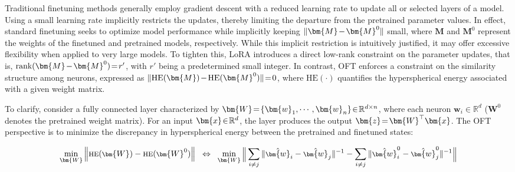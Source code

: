 Traditional finetuning methods generally employ gradient descent with a reduced learning rate to update all or selected layers of a model. Using a small learning rate implicitly restricts the updates, thereby limiting the departure from the pretrained parameter values. In effect, standard finetuning seeks to optimize model performance while implicitly keeping $\thickmuskip=2mu \medmuskip=2mu \| \bm{M} - \bm{M}^0\|$ small, where $\bm{M}$ and $\bm{M}^0$ represent the weights of the finetuned and pretrained models, respectively. While this implicit restriction is intuitively justified, it may offer excessive flexibility when applied to very large models. To tighten this, LoRA introduces a direct low-rank constraint on the parameter updates, that is, $\thickmuskip=2mu \medmuskip=2mu \text{rank}(\bm{M} - \bm{M}^0)=r'$, with $r'$ being a predetermined small integer. In contrast, OFT enforces a constraint on the similarity structure among neurons, expressed as $\thickmuskip=2mu \medmuskip=2mu \| \text{HE}(\bm{M})-\text{HE}(\bm{M}^0) \|=0$, where $\text{HE}(\cdot)$ quantifies the hyperspherical energy associated with a given weight matrix.

To clarify, consider a fully connected layer characterized by $\thickmuskip=2mu \medmuskip=2mu \bm{W}=\{\bm{w}_1,\cdots,\bm{w}_n\}\in\mathbb{R}^{d\times n}$, where each neuron $\bm{w}_i\in\mathbb{R}^{d}$ ($\bm{W}^0$ denotes the pretrained weight matrix). For an input $\thickmuskip=2mu \medmuskip=2mu \bm{x}\in\mathbb{R}^d$, the layer produces the output $\thickmuskip=2mu \medmuskip=2mu \bm{z}=\bm{W}^\top\bm{x}$. The OFT perspective is to minimize the discrepancy in hyperspherical energy between the pretrained and finetuned states:

\begin{equation}\label{eq:oft_principle}
\footnotesize
\min_{\bm{W}} \left\| \text{HE}(\bm{W})-\text{HE}(\bm{W}^0)\right\|~~\Leftrightarrow~~\min_{\bm{W}} \bigg{\|} \sum_{i\neq j} \|\hat{\bm{w}}_i-\hat{\bm{w}}_j\|^{-1}-\sum_{i\neq j} \|\hat{\bm{w}}^0_i-\hat{\bm{w}}^0_j\|^{-1}\bigg{\|}
\end{equation}

